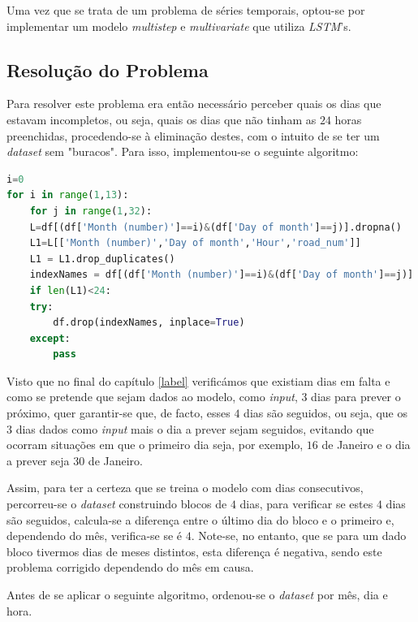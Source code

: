 \documentclass[a4paper, 12pt]{article}
\begin{document}
Uma vez que se trata de um problema de séries temporais, optou-se por implementar um modelo \textit{multistep} e \textit{multivariate} que utiliza \textit{LSTM}'s.

\subsection{Resolução do Problema}

Para resolver este problema era então necessário perceber quais os dias que estavam incompletos, ou seja, quais os dias que não tinham as $24$ horas preenchidas, procedendo-se à eliminação destes, com o intuito de se ter um \textit{dataset} sem "buracos". Para isso, implementou-se o seguinte algoritmo:

\begin{lstlisting}[language=Python]
i=0
for i in range(1,13):
	for j in range(1,32):
	L=df[(df['Month (number)']==i)&(df['Day of month']==j)].dropna()
	L1=L[['Month (number)','Day of month','Hour','road_num']]
	L1 = L1.drop_duplicates()
	indexNames = df[(df['Month (number)']==i)&(df['Day of month']==j)].index
	if len(L1)<24:
	try:
		df.drop(indexNames, inplace=True)
	except:
		pass
\end{lstlisting}

Visto que no final do capítulo \ref{label} verificámos que existiam dias em falta e como se pretende que sejam dados ao modelo, como \textit{input}, $3$ dias para prever o próximo, quer garantir-se que, de facto, esses $4$ dias são seguidos, ou seja, que os $3$ dias dados como \textit{input} mais o dia a prever sejam seguidos, evitando que ocorram situações em que o primeiro dia seja, por exemplo, $16$ de Janeiro e o dia a prever seja $30$ de Janeiro.

Assim, para ter a certeza que se treina o modelo com dias consecutivos, percorreu-se o \textit{dataset} construindo blocos de $4$ dias, para verificar se estes $4$ dias são seguidos, calcula-se a diferença entre o último dia do bloco e o primeiro e, dependendo do mês, verifica-se se é $4$. Note-se, no entanto, que se para um dado bloco tivermos dias de meses distintos, esta diferença é negativa, sendo este problema corrigido dependendo do mês em causa.

Antes de se aplicar o seguinte algoritmo, ordenou-se o \textit{dataset} por mês, dia e hora.
\end{document}
